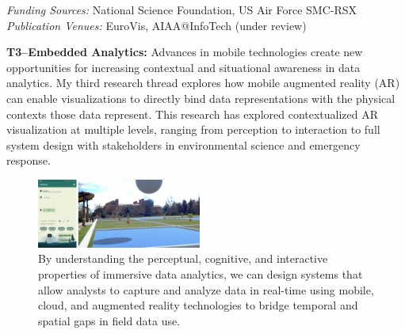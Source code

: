 \documentclass[11pt]{article}
\begin{document}

\emph{Funding Sources:} National Science Foundation, US Air Force SMC-RSX\\
\emph{Publication Venues:} EuroVis, AIAA@InfoTech (under review)

\textbf{T3--Embedded Analytics: }
Advances in mobile technologies create new opportunities for increasing contextual and situational awareness in data analytics. My third research thread explores how mobile augmented reality (AR) can enable visualizations to directly bind data representations with the physical contexts those data represent. 
This research has explored contextualized AR visualization at multiple levels, ranging from perception to interaction to full system design with stakeholders in environmental science and emergency response. 

\begin{figure}
	\begin{center}
		\includegraphics[width=0.48\textwidth]{fieldview}
	\end{center}
	\caption{By understanding the perceptual, cognitive, and interactive properties of immersive data analytics, we can design systems that allow analysts to capture and analyze data in real-time using mobile, cloud, and augmented reality technologies to bridge temporal and spatial gaps in field data use.}\label{fieldview}
\end{figure}
\end{document}

